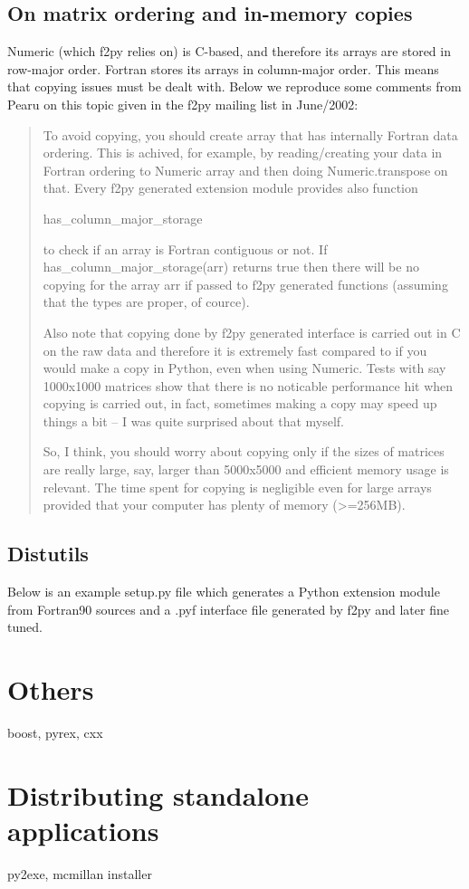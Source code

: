 \subsection{On matrix ordering and in-memory copies}

Numeric (which f2py relies on) is C-based, and therefore its arrays
are stored in row-major order. Fortran stores its arrays in column-major
order. This means that copying issues must be dealt with. Below we
reproduce some comments from Pearu on this topic given in the f2py
mailing list in June/2002: 

\begin{quote}
To avoid copying, you should create array that has internally Fortran
data ordering. This is achived, for example, by reading/creating your
data in Fortran ordering to Numeric array and then doing Numeric.transpose
on that. Every f2py generated extension module provides also function 

has\_column\_major\_storage

to check if an array is Fortran contiguous or not. If has\_column\_major\_storage(arr)
returns true then there will be no copying for the array arr if passed
to f2py generated functions (assuming that the types are proper, of
cource).

Also note that copying done by f2py generated interface is carried
out in C on the raw data and therefore it is extremely fast compared
to if you would make a copy in Python, even when using Numeric. Tests
with say 1000x1000 matrices show that there is no noticable performance
hit when copying is carried out, in fact, sometimes making a copy
may speed up things a bit -- I was quite surprised about that myself.

So, I think, you should worry about copying only if the sizes of matrices
are really large, say, larger than 5000x5000 and efficient memory
usage is relevant. The time spent for copying is negligible even for
large arrays provided that your computer has plenty of memory (>=256MB).
\end{quote}

\subsection{Distutils}

Below is an example setup.py file which generates a Python extension
module from Fortran90 sources and a .pyf interface file generated
by f2py and later fine tuned. 




\section{Others}

boost, pyrex, cxx


\section[Standalone applications]{Distributing standalone applications}

py2exe, mcmillan installer
